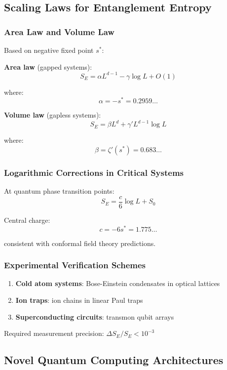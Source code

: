 \documentclass[11pt]{article}
\theoremstyle{plain}
\theoremstyle{definition}
\theoremstyle{remark}
\begin{document}
\subsection{Scaling Laws for Entanglement Entropy}

\subsubsection{Area Law and Volume Law}

Based on negative fixed point $s^*$:

\textbf{Area law} (gapped systems):
$$S_E = \alpha L^{d-1} - \gamma \log L + O(1)$$

where:
$$\alpha = -s^* = 0.2959\ldots$$

\textbf{Volume law} (gapless systems):
$$S_E = \beta L^d + \gamma' L^{d-1} \log L$$

where:
$$\beta = \zeta'(s^*) = 0.683\ldots$$

\subsubsection{Logarithmic Corrections in Critical Systems}

At quantum phase transition points:
$$S_E = \frac{c}{6} \log L + S_0$$

Central charge:
$$c = -6s^* = 1.775\ldots$$

consistent with conformal field theory predictions.

\subsubsection{Experimental Verification Schemes}

\begin{enumerate}
\item \textbf{Cold atom systems}: Bose-Einstein condensates in optical lattices
\item \textbf{Ion traps}: ion chains in linear Paul traps
\item \textbf{Superconducting circuits}: transmon qubit arrays
\end{enumerate}

Required measurement precision: $\Delta S_E / S_E < 10^{-3}$

\subsection{Novel Quantum Computing Architectures}
\end{document}
